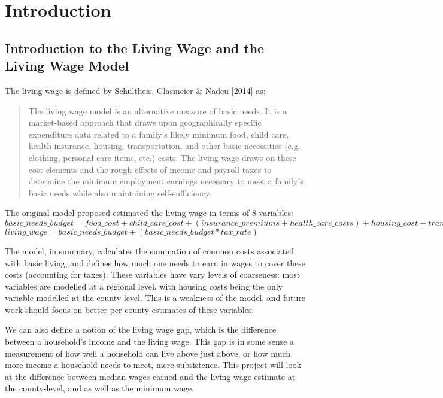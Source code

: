\chapter{Introduction}\label{ch:introduction}

\section{Introduction to the Living Wage and the Living Wage Model}

The living wage is defined by Schultheis, Glasmeier \& Nadeu [2014]\cite{glasmeier2014} as:

\begin{quote}
The living wage model is an alternative measure of basic needs. It is a market-based approach that draws upon geographically specific expenditure data related to a family's likely minimum food, child care, health insurance, housing, transportation, and other basic necessities (e.g. clothing, personal care items, etc.) costs. The living wage draws on these cost elements and the rough effects of income and payroll taxes to determine the minimum employment earnings necessary to meet a family's basic needs while also maintaining self-sufficiency.
\end{quote}

The original model proposed estimated the living wage in terms of 8 variables:
\newline
\newline
$basic\_needs\_budget = food\_cost + child\_care\_cost + ( insurance\_premiums + health\_care\_costs ) + housing\_cost + transportation\_cost + other\_necessities\_cost$
\newline
\newline
$living\_wage = basic\_needs\_budget + ( basic\_needs\_budget * tax\_rate )$
\newline

The model, in summary, calculates the summation of common costs associated with basic living, and defines how much one needs to earn in wages to cover these costs (accounting for taxes). These variables have vary levels of coarseness: most variables are modelled at a regional level, with housing costs being the only variable modelled at the county level. This is a weakness of the model, and future work should focus on better per-county estimates of these variables.

We can also define a notion of the living wage gap, which is the difference between a household's income and the living wage. This gap is in some sense a measurement of how well a household can live above just above, or how much more income a household needs to meet, mere subsistence.  This project will look at the difference between median wages earned and the living wage estimate at the county-level, and as well as the minimum wage.

